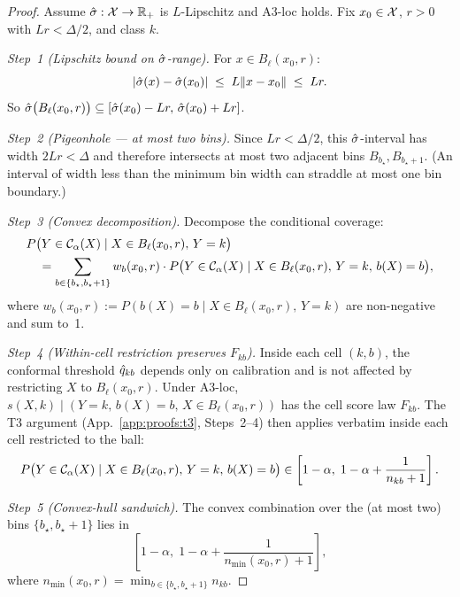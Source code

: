\begin{proof}
Assume $\hat{\sigma} : \mathcal{X} \to \mathbb{R}_+$ is $L$-Lipschitz and A3-loc holds. Fix $x_0 \in \mathcal{X}$, $r > 0$ with $Lr < \Delta / 2$, and class $k$.

\textit{Step~1 (Lipschitz bound on $\hat{\sigma}$-range).}
For $x \in B_\ell(x_0, r)$:
\[
|\hat{\sigma}(x) - \hat{\sigma}(x_0)| \;\leq\; L \|x - x_0\| \;\leq\; Lr.
\]
So $\hat{\sigma}\bigl(B_\ell(x_0, r)\bigr) \subseteq [\hat{\sigma}(x_0) - Lr,\, \hat{\sigma}(x_0) + Lr]$.

\textit{Step~2 (Pigeonhole --- at most two bins).}
Since $Lr < \Delta / 2$, this $\hat{\sigma}$-interval has width $2Lr < \Delta$ and therefore intersects at most two adjacent bins $B_{b_\star}, B_{b_\star + 1}$. (An interval of width less than the minimum bin width can straddle at most one bin boundary.)

\textit{Step~3 (Convex decomposition).}
Decompose the conditional coverage:
\begin{align*}
&P\bigl(Y \in \mathcal{C}_\alpha(X) \mid X \in B_\ell(x_0, r),\, Y = k\bigr) \\
&\quad = \sum_{b \in \{b_\star, b_\star + 1\}} w_b(x_0, r) \cdot P\bigl(Y \in \mathcal{C}_\alpha(X) \mid X \in B_\ell(x_0, r),\, Y = k,\, b(X) = b\bigr),
\end{align*}
where $w_b(x_0, r) := P(b(X) = b \mid X \in B_\ell(x_0, r),\, Y = k)$ are non-negative and sum to~1.

\textit{Step~4 (Within-cell restriction preserves $F_{kb}$).}
Inside each cell $(k, b)$, the conformal threshold $\hat{q}_{kb}$ depends only on calibration and is not affected by restricting $X$ to $B_\ell(x_0, r)$. Under A3-loc, $s(X, k) \mid (Y = k,\, b(X) = b,\, X \in B_\ell(x_0, r))$ has the cell score law $F_{kb}$. The T3 argument (App.~\ref{app:proofs:t3}, Steps~2--4) then applies verbatim inside each cell restricted to the ball:
\[
P\bigl(Y \in \mathcal{C}_\alpha(X) \mid X \in B_\ell(x_0, r),\, Y = k,\, b(X) = b\bigr)
\in \left[1 - \alpha,\; 1 - \alpha + \frac{1}{n_{kb} + 1}\right].
\]

\textit{Step~5 (Convex-hull sandwich).}
The convex combination over the (at most two) bins $\{b_\star, b_\star + 1\}$ lies in
\[
\left[1 - \alpha,\; 1 - \alpha + \frac{1}{n_{\min}(x_0, r) + 1}\right],
\]
where $n_{\min}(x_0, r) = \min_{b \in \{b_\star, b_\star+1\}} n_{kb}$.
\end{proof}

